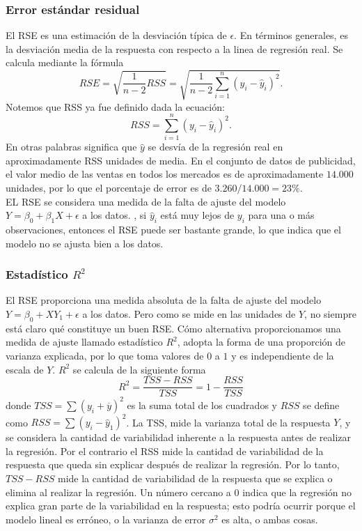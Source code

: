 \subsubsection{Error estándar residual}
El RSE es una estimación de la desviación típica de $\epsilon$. En términos generales, es la desviación media de la respuesta con respecto a la linea de regresión real. Se calcula mediante la fórmula
$$RSE=\sqrt{\dfrac{1}{n-2}RSS}=\sqrt{\dfrac{1}{n-2}\sum_{i=1}^n(y_i-\hat{y}_i)^2}.$$
Notemos que RSS ya fue definido dada la ecuación:
$$RSS=\sum_{i=1}^n(y_i-\hat{y}_i)^2.$$
En otras palabras significa que $\hat{y}$ se desvía de la regresión real en aproximadamente RSS unidades de media. En el conjunto de datos de publicidad, el valor medio de las ventas en todos los mercados es de aproximadamente $14.000$ unidades, por lo que el porcentaje de error es de $3.260/14.000 = 23 \%$.\\
EL RSE se considera una medida de la falta de ajuste del modelo $Y=\beta_0+\beta_1X + \epsilon$ a los datos. , si $\hat{y}_i$ está muy lejos de $y_i$ para una o más observaciones, entonces el RSE puede ser bastante grande, lo que indica que el modelo no se ajusta bien a los datos.

\subsubsection{Estadístico \boldmath$R^2$}
El RSE proporciona una medida absoluta de la falta de ajuste del modelo $Y=\beta_0+XY_1+\epsilon$ a los datos. Pero como se mide en las unidades de $Y$, no siempre está claro qué constituye un buen RSE. Cómo alternativa proporcionamos una medida de ajuste llamado estadístico $R^2$, adopta la forma de una proporción de varianza explicada, por lo que toma valores de $0$ a $1$ y es independiente de la escala de $Y$. $R^2$ se calcula de la siguiente forma
$$R^2=\dfrac{TSS-RSS}{TSS}=1-\dfrac{RSS}{TSS}$$
donde $TSS=\sum \left(y_i+\overline{y}\right)^2$ es la suma total de los cuadrados y $RSS$ se define como $RSS=\sum\left(y_i-\hat{y}_1\right)^2$. La TSS, mide la varianza total de la respuesta $Y$, y se considera la cantidad de variabilidad inherente a la respuesta antes de realizar la regresión. Por el contrario el RSS mide la cantidad de variabilidad de la respuesta que queda sin explicar después de realizar la regresión. Por lo tanto, $TSS-RSS$ mide la cantidad de variabilidad de la respuesta que se explica o elimina al realizar la regresión. Un número cercano a $0$ indica que la regresión no explica gran parte de la variabilidad en la respuesta; esto podría ocurrir porque el modelo lineal es erróneo, o la varianza de error $\sigma^2$ es alta, o ambas cosas.\\

